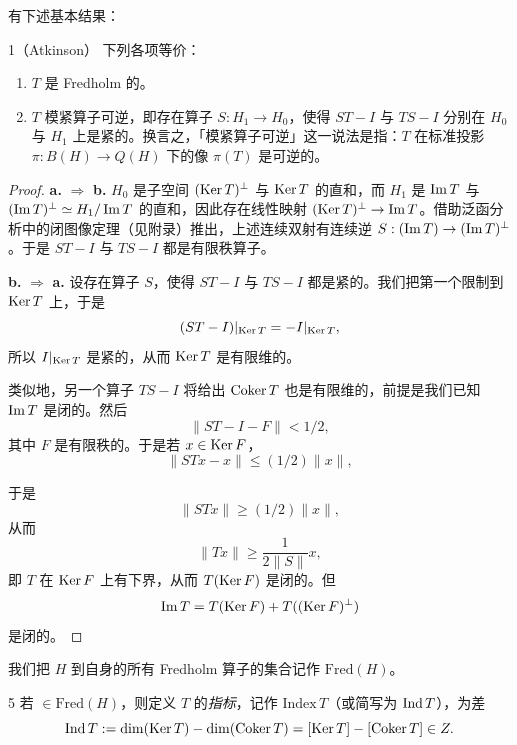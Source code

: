 有下述基本结果：

\begin{thm}{1（Atkinson）} 下列各项等价：
\begin{enumerate}[label=\textbf{\alph*.},leftmargin=2.2em,itemsep=3pt]
  \item $T$ 是 Fredholm 的。
  \item $T$ 模紧算子可逆，即存在算子 $S:H_1\to H_0$，使得 $ST-I$ 与 $TS-I$ 分别在 $H_0$ 与 $H_1$ 上是紧的。换言之，「模紧算子可逆」这一说法是指：$T$ 在标准投影 $\pi:B(H)\to Q(H)$ 下的像 $\pi(T)$ 是可逆的。
\end{enumerate}
\end{thm}

\begin{proof}
\textbf{a.} $\Rightarrow$ \textbf{b.}
$H_0$ 是子空间 $(\operatorname{Ker} T)^\perp$ 与 $\operatorname{Ker} T$ 的直和，而 $H_1$ 是 $\operatorname{Im} T$ 与 $(\operatorname{Im} T)^\perp\simeq H_1/\operatorname{Im} T$ 的直和，因此存在线性映射 $(\operatorname{Ker} T)^\perp\to\operatorname{Im} T$。借助泛函分析中的闭图像定理（见附录）推出，上述连续双射有连续逆 $S:(\operatorname{Im} T)\to(\operatorname{Im} T)^\perp$。于是 $ST-I$ 与 $TS-I$ 都是有限秩算子。

\textbf{b.} $\Rightarrow$ \textbf{a.}
设存在算子 $S$，使得 $ST-I$ 与 $TS-I$ 都是紧的。我们把第一个限制到 $\operatorname{Ker} T$ 上，于是
\[ (ST-I)|_{\operatorname{Ker} T}=-I|_{\operatorname{Ker} T}, \]
所以 $I|_{\operatorname{Ker} T}$ 是紧的，从而 $\operatorname{Ker} T$ 是有限维的。

类似地，另一个算子 $TS-I$ 将给出 $\operatorname{Coker} T$ 也是有限维的，前提是我们已知 $\operatorname{Im} T$ 是闭的。然后
\[ \|ST-I-F\|<1/2, \]
其中 $F$ 是有限秩的。于是若 $x\in\operatorname{Ker} F$，
\[ \|STx-x\|\le(1/2)\|x\|, \]


于是
\[ \|STx\|\ge(1/2)\|x\|, \]
从而
\[ \|Tx\|\ge\frac{1}{2\|S\|}x, \]
即 $T$ 在 $\operatorname{Ker} F$ 上有下界，从而 $T(\operatorname{Ker} F)$ 是闭的。但
\[ \operatorname{Im} T=T(\operatorname{Ker} F)+T((\operatorname{Ker} F)^\perp) \]
是闭的。
\end{proof}

我们把 $H$ 到自身的所有 Fredholm 算子的集合记作 $\mathrm{Fred}(H)$。

\begin{defn}{5} 若 $\in\mathrm{Fred}(H)$，则定义 $T$ 的\emph{指标}，记作 $\mathrm{Index}\,T$（或简写为 $\operatorname{Ind} T$），为差
\[ \operatorname{Ind} T:=\dim(\operatorname{Ker} T)-\dim(\operatorname{Coker} T)=[\operatorname{Ker} T]-[\operatorname{Coker} T]\in Z. \]
\end{defn}


